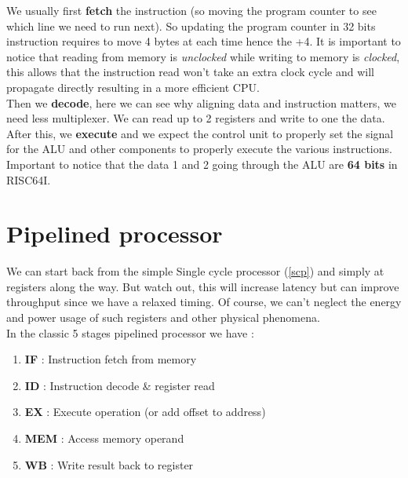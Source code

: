 \documentclass{report}
\begin{document}
We usually first \textbf{fetch} the instruction (so moving the program counter to see which line we need to run next). So updating the program counter in 32 bits instruction requires to move 4 bytes at each time hence the +4. It is important to notice that reading from memory is \textit{unclocked} while writing to memory is \textit{clocked}, this allows that the instruction read won't take an extra clock cycle and will propagate directly resulting in a more efficient CPU.\\
Then we \textbf{decode}, here we can see why aligning data and instruction matters, we need less multiplexer. We can read  up to 2 registers and write to one the data.\\
After this, we \textbf{execute} and we expect the control unit to properly set the signal for the ALU and other components to properly execute the various instructions. Important to notice that the data 1 and 2 going through the ALU are \textbf{64 bits} in RISC64I.

\section{Pipelined processor}

We can start back from the simple Single cycle processor (\ref{scp}) and simply at registers along the way. But watch out, this will increase latency but can improve throughput since we have a relaxed timing. Of course, we can't neglect the energy and power usage of such registers and other physical phenomena.\\

In the classic 5 stages pipelined processor we have : 

\begin{enumerate}
    \item \textbf{IF} : Instruction fetch from memory
    \item \textbf{ID} : Instruction decode \& register read
    \item \textbf{EX} : Execute operation (or add offset to address)
    \item \textbf{MEM} : Access memory operand
    \item \textbf{WB} : Write result back to register
\end{enumerate}
\end{document}
